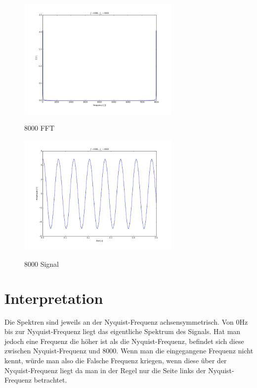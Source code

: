 \documentclass[TGAI_Laborbericht.tex]{subfiles}
\begin{document}
\begin{figure}[H]
	\includegraphics[width=0.7\textwidth]{media/8000-fft.png}
	\label{8000 FFT}
	\caption{8000 FFT}
\end{figure}

\begin{figure}[H]
	\includegraphics[width=0.7\textwidth]{media/8000-signal.png}
	\label{8000 Signal}
	\caption{8000 Signal}
\end{figure}
\section{Interpretation}
\label{chap:VERSUCH_4_INTERPRETATION}
Die Spektren sind jeweils an der Nyquist-Frequenz achsensymmetrisch. Von 0Hz bis zur Nyquist-Frequenz liegt das eigentliche Spektrum des Signals. Hat man jedoch eine Frequenz die höher ist als die Nyquist-Frequenz, befindet sich diese zwischen Nyquist-Frequenz und 8000. Wenn man die eingegangene Frequenz nicht kennt, würde man also die Falsche Frequenz kriegen, wenn diese über der Nyquist-Frequenz liegt da man in der Regel nur die Seite links der Nyquist-Frequenz betrachtet.
\end{document}
